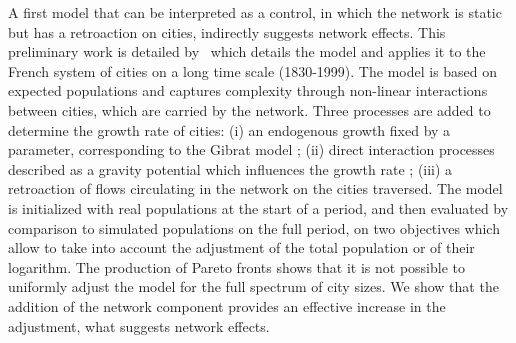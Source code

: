 \documentclass[11pt]{article}
\begin{document}
A first model that can be interpreted as a control, in which the network is static but has a retroaction on cities, indirectly suggests network effects. This preliminary work is detailed by~\cite{raimbault2018indirect} which details the model and applies it to the French system of cities on a long time scale (1830-1999). The model is based on expected populations and captures complexity through non-linear interactions between cities, which are carried by the network. Three processes are added to determine the growth rate of cities: (i) an endogenous growth fixed by a parameter, corresponding to the Gibrat model ; (ii) direct interaction processes described as a gravity potential which influences the growth rate ; (iii) a retroaction of flows circulating in the network on the cities traversed. The model is initialized with real populations at the start of a period, and then evaluated by comparison to simulated populations on the full period, on two objectives which allow to take into account the adjustment of the total population or of their logarithm. The production of Pareto fronts shows that it is not possible to uniformly adjust the model for the full spectrum of city sizes. We show that the addition of the network component provides an effective increase in the adjustment, what suggests network effects.
\end{document}
